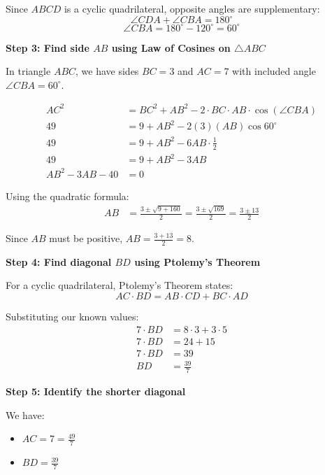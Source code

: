\documentclass[11pt]{article}
\begin{document}
Since $ABCD$ is a cyclic quadrilateral, opposite angles are supplementary:
\[\angle CDA + \angle CBA = 180^\circ\]
\[\angle CBA = 180^\circ - 120^\circ = 60^\circ\]

\vspace{0.3cm}

\textbf{Step 3: Find side $AB$ using Law of Cosines on $\triangle ABC$}

In triangle $ABC$, we have sides $BC = 3$ and $AC = 7$ with included angle $\angle CBA = 60^\circ$.

\begin{align*}
AC^2 &= BC^2 + AB^2 - 2 \cdot BC \cdot AB \cdot \cos(\angle CBA) \\
49 &= 9 + AB^2 - 2(3)(AB)\cos 60^\circ \\
49 &= 9 + AB^2 - 6AB \cdot \frac{1}{2} \\
49 &= 9 + AB^2 - 3AB \\
AB^2 - 3AB - 40 &= 0
\end{align*}

Using the quadratic formula:
\begin{align*}
AB &= \frac{3 \pm \sqrt{9 + 160}}{2} = \frac{3 \pm \sqrt{169}}{2} = \frac{3 \pm 13}{2}
\end{align*}

Since $AB$ must be positive, $AB = \frac{3 + 13}{2} = 8$.

\vspace{0.3cm}

\textbf{Step 4: Find diagonal $BD$ using Ptolemy's Theorem}

For a cyclic quadrilateral, Ptolemy's Theorem states:
\[AC \cdot BD = AB \cdot CD + BC \cdot AD\]

Substituting our known values:
\begin{align*}
7 \cdot BD &= 8 \cdot 3 + 3 \cdot 5 \\
7 \cdot BD &= 24 + 15 \\
7 \cdot BD &= 39 \\
BD &= \frac{39}{7}
\end{align*}

\vspace{0.3cm}

\textbf{Step 5: Identify the shorter diagonal}

We have:
\begin{itemize}
    \item $AC = 7 = \frac{49}{7}$
    \item $BD = \frac{39}{7}$
\end{itemize}
\end{document}

